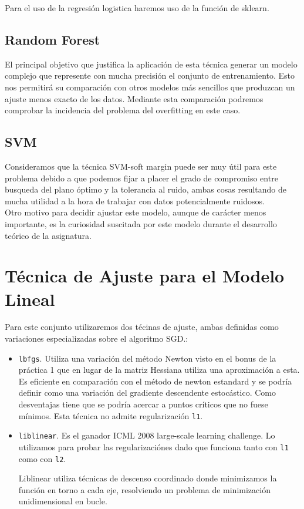\documentclass[11pt,a4paper]{article}
\begin{document}
Para el uso de la regresión logistica haremos uso de la función de sklearn. 

\subsection{Random Forest}

El principal objetivo que justifica la aplicación de esta técnica generar un modelo complejo que represente con mucha precisión el conjunto de entrenamiento. Esto nos permitirá su comparación con otros modelos más sencillos que produzcan un ajuste menos exacto de los datos. Mediante esta comparación podremos comprobar la incidencia del problema del overfitting en este caso. 

\subsection{SVM}

Consideramos que la técnica SVM-soft margin puede ser muy útil para este problema debido a que podemos fijar a placer el grado de compromiso entre busqueda del plano óptimo y la tolerancia al ruido, ambas cosas resultando de mucha utilidad a la hora de trabajar con datos potencialmente ruidosos.\\

Otro motivo para decidir ajustar este modelo, aunque de carácter menos importante, es la curiosidad suscitada por este modelo durante el desarrollo teórico de la asignatura. 

\section{ Técnica de Ajuste para el Modelo Lineal}
Para este conjunto utilizaremos dos técinas de ajuste, ambas definidas como variaciones especializadas sobre el algoritmo SGD.:
\begin{itemize}
	\item \texttt{lbfgs}. Utiliza una variación del método Newton visto en el bonus de la práctica 1 que en lugar de la matriz Hessiana utiliza una aproximación a esta. Es eficiente en comparación con el método de newton estandard y se podría definir como una variación del gradiente descendente estocástico. Como desventajas tiene que se podría acercar a puntos críticos que no fuese mínimos. Esta técnica no admite regularización \texttt{l1}.
	\item \texttt{liblinear}. Es el ganador ICML 2008 large-scale learning challenge. Lo utilizamos para probar las regularizaciónes dado que funciona tanto con \texttt{l1} como con \texttt{l2}.
	
	Liblinear utiliza técnicas de descenso coordinado\cite{CD} donde minimizamos la función en torno a cada eje, resolviendo un problema de minimización unidimensional en bucle. 
\end{itemize}
\end{document}
